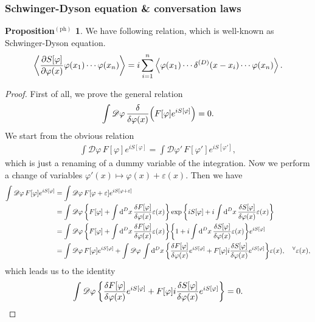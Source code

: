\documentclass{article}
\theoremstyle{definition}
\newtheorem{propositionph}{Proposition$^\mathrm{(ph)}$}[section]
\numberwithin{equation}{section}
\renewcommand{\mapsto}{\longmapsto}
\newcommand{\fivarphi}{\int \mathscr{D} \varphi\,}
\newcommand{\intst}{\int \dd^Dx \,}
\begin{document}
\subsubsection{Schwinger-Dyson equation \& conversation laws}
\begin{propositionph}
  We have following relation, which is well-known as Schwinger-Dyson equation.
  \begin{align}
    \ev{\frac{\partial S[\varphi]}{\partial \varphi(x)} \varphi(x_1) \cdots \varphi(x_n)} = i \sum_{i = 1}^{n} \ev{\varphi(x_1) \cdots \delta^{(D)}(x - x_i) \cdots \varphi(x_n)}.
  \end{align}  
\end{propositionph}
\begin{proof}
  First of all, we prove the general relation
  \begin{align}
    \int \mathscr{D} \varphi \, \frac{\delta}{\delta \varphi(x)} \qty(F[\varphi] e^{iS[\varphi]}) = 0.
  \end{align}
  We start from the obvious relation
  \begin{align}
    \int \mathscr{D} \varphi \, F[\varphi] e^{iS[\varphi]} = \int \mathscr{D} \varphi' \, F[\varphi'] e^{iS[\varphi']},
  \end{align}
  which is just a renaming of a dummy variable of the integration. Now we perform a change of variables $\varphi'(x) \mapsto \varphi(x) + \varepsilon(x)$. Then we have
  \begin{align}
    \int \mathscr{D}\varphi \, F[\varphi] e^{iS[\varphi]}
    &= \fivarphi F[\varphi + \varepsilon]e^{iS[\varphi + \varepsilon]} \notag \\
    &= \fivarphi \qty{F[\varphi] + \intst \frac{\delta F[\varphi]}{\delta \varphi(x)} \varepsilon(x)}
      \exp\qty{iS[\varphi] + i \intst \frac{\delta S[\varphi]}{\delta \varphi(x)} \varepsilon(x)} \notag \\
    &= \fivarphi \qty{F[\varphi] + \intst \frac{\delta F[\varphi]}{\delta \varphi(x)} \varepsilon(x)}
      \qty{1 + i\intst \frac{\delta S[\varphi]}{\delta \varphi(x)}\varepsilon(x)}e^{iS[\varphi]} \notag \\
    &= \fivarphi F[\varphi] e^{iS[\varphi]} + \fivarphi \intst
      \qty{\frac{\delta F[\varphi]}{\delta\varphi(x)} e^{iS[\varphi]} + F[\varphi] i\frac{\delta S[\varphi]}{\delta \varphi(x)} e^{iS[\varphi]}}\varepsilon(x),
      \quad ^\forall \varepsilon(x),
  \end{align}
  which leads us to the identity
  \begin{align}
    \fivarphi \qty{\frac{\delta F[\varphi]}{\delta\varphi(x)} e^{iS[\varphi]} + F[\varphi] i\frac{\delta S[\varphi]}{\delta \varphi(x)} e^{iS[\varphi]}} = 0.

\end{align}
\end{proof}
\end{document}
